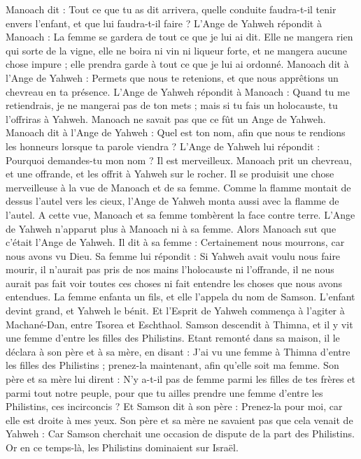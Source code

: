 \begin{multicols}{2}
Manoach dit : Tout ce que tu as dit arrivera, quelle conduite faudra-t-il tenir envers l'enfant, et que lui faudra-t-il faire ?
L'Ange de Yahweh répondit à Manoach : La femme se gardera de tout ce que je lui ai dit.
Elle ne mangera rien qui sorte de la vigne, elle ne boira ni vin ni liqueur forte, et ne mangera aucune chose impure ; elle prendra garde à tout ce que je lui ai ordonné.
Manoach dit à l'Ange de Yahweh : Permets que nous te retenions, et que nous apprêtions un chevreau en ta présence.
L'Ange de Yahweh répondit à Manoach : Quand tu me retiendrais, je ne mangerai pas de ton mets ; mais si tu fais un holocauste, tu l'offriras à Yahweh. Manoach ne savait pas que ce fût un Ange de Yahweh.
Manoach dit à l'Ange de Yahweh : Quel est ton nom, afin que nous te rendions les honneurs lorsque ta parole viendra ?
L'Ange de Yahweh lui répondit : Pourquoi demandes-tu mon nom ? Il est merveilleux.
Manoach prit un chevreau, et une offrande, et les offrit à Yahweh sur le rocher. Il se produisit une chose merveilleuse à la vue de Manoach et de sa femme.
Comme la flamme montait de dessus l'autel vers les cieux, l'Ange de Yahweh monta aussi avec la flamme de l'autel. A cette vue, Manoach et sa femme tombèrent la face contre terre.
L'Ange de Yahweh n'apparut plus à Manoach ni à sa femme. Alors Manoach sut que c'était l'Ange de Yahweh.
Il dit à sa femme : Certainement nous mourrons, car nous avons vu Dieu.
Sa femme lui répondit : Si Yahweh avait voulu nous faire mourir, il n'aurait pas pris de nos mains l'holocauste ni l'offrande, il ne nous aurait pas fait voir toutes ces choses ni fait entendre les choses que nous avons entendues.
La femme enfanta un fils, et elle l'appela du nom de Samson. L'enfant devint grand, et Yahweh le bénit.
Et l'Esprit de Yahweh commença à l'agiter à Machané-Dan, entre Tsorea et Eschthaol.
\VerseOne{}Samson descendit à Thimna, et il y vit une femme d'entre les filles des Philistins.
Etant remonté dans sa maison, il le déclara à son père et à sa mère, en disant : J'ai vu une femme à Thimna d'entre les filles des Philistins ; prenez-la maintenant, afin qu'elle soit ma femme.
Son père et sa mère lui dirent : N'y a-t-il pas de femme parmi les filles de tes frères et parmi tout notre peuple, pour que tu ailles prendre une femme d'entre les Philistins, ces incirconcis ? Et Samson dit à son père : Prenez-la pour moi, car elle est droite à mes yeux.
Son père et sa mère ne savaient pas que cela venait de Yahweh : Car Samson cherchait une occasion de dispute de la part des Philistins. Or en ce temps-là, les Philistins dominaient sur Israël.

\end{multicols}
